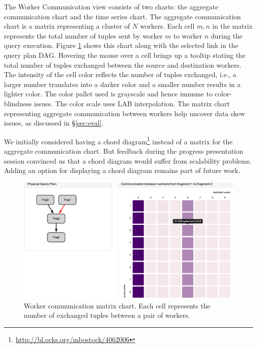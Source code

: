 \documentclass{chi2009}
\begin{document}
The Worker Communication view consists of two charts: the aggregate communication 
chart and the time series chart. The aggregate communication chart is a matrix representing
a cluster of $N$ workers. Each cell $m,n$ in the matrix represents the total number of tuples sent
by worker $m$ to worker $n$ during the query execution. Figure \ref{fig:matrix} shows this chart along 
with the selected link in the query plan DAG. Hovering the mouse over a cell brings up a tooltip
stating the total number of tuples exchanged between the source and destination workers. The intensity
of the cell color reflects the number of tuples exchanged, i.e., a larger number translates into a darker color 
and a smaller number results in a lighter color. The color pallet used is grayscale and hence
immune to color-blindness issues. The color scale uses LAB interpolation.
The matrix chart representing aggregate communication 
between workers help uncover data skew issues, as discussed in \S \ref{sec:eval}. 

We initially considered having a chord diagram\footnote{\url{http://bl.ocks.org/mbostock/4062006}} instead of a matrix 
for the aggregate communication chart. But feedback during the progress presentation session convinced us that 
a chord diagram would suffer from scalability problems. Adding an option for displaying a chord diagram remains
part of future work.   

\begin{figure}[!ht]
  \includegraphics[width=\columnwidth]{images/networkVis1}
  \caption{Worker communication matrix chart. Each cell represents the number of exchanged tuples between a 
  pair of workers.}
  \label{fig:matrix}
\end{figure}
\end{document}
